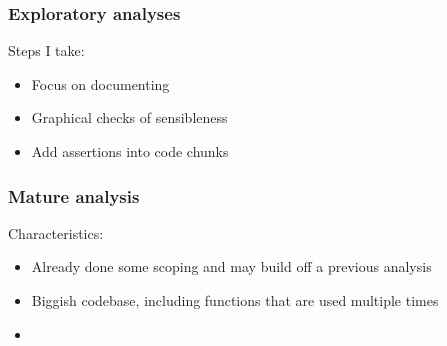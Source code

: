 \documentclass[handout]{beamer}
\begin{document}
\begin{frame}
	\frametitle{Exploratory analyses}
	
	Steps I take:
	
	\begin{itemize}
		\item Focus on documenting 
		\item Graphical checks of sensibleness
		\item Add assertions into code chunks
	\end{itemize}
	
\end{frame}

\begin{frame}
	\frametitle{Mature analysis}
	
	Characteristics:
	
	\begin{itemize}
		\item Already done some scoping and may build off a previous analysis
		\item Biggish codebase, including functions that are used multiple times
		\item 
	\end{itemize}
	
\end{frame}
\end{document}

